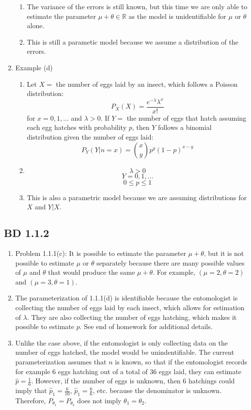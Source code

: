 \documentclass[a4paper,12pt]{article}
\begin{document}
\begin{enumerate}
\begin{enumerate}
      \item The variance of the errors is still known, but this time we are only able to estimate the parameter $\mu+\theta\in\mathbb{R}$ as the model is unidentifiable for $\mu$ or $\theta$ alone.
      \item This is still a parametic model because we assume a distribution of the errors.
    \end{enumerate}
    \item Example (d)
    \begin{enumerate}
       \item Let $X=$ the number of eggs laid by an insect, which follows a Poisson distribution:$$P_X(X)=\frac{e^{-\lambda}\lambda^x}{x!}$$ for $x=0,1,...$ and $\lambda>0$. If $Y=$ the number of eggs that hatch assuming each egg hatches with probability $p$, then $Y$ follows a binomial distribution given the number of eggs laid:$$P_Y(Y|n=x)={x\choose y}p^y(1-p)^{x-y}$$
       \item $$\lambda>0$$ $$Y=0,1,...$$ $$0\leq p\leq 1$$
       \item This is also a parametric model because we are assuming distributions for $X$ and $Y|X$.
     \end{enumerate}
\end{enumerate}
\subsection{BD 1.1.2}
\begin{enumerate}
  \item Problem 1.1.1(c): It is possible to estimate the parameter $\mu+\theta$, but it is not possible to estimate $\mu$ or $\theta$ separately because there are many possible values of $\mu$ and $\theta$ that would produce the same $\mu+\theta$. For example, $(\mu=2,\theta=2)$ and $(\mu=3,\theta=1)$.
  \item The parameterization of 1.1.1(d) is identifiable because the entomologist is collecting the number of eggs laid by each insect, which allows for estimation of $\lambda$. They are also collecting the number of eggs hatching, which makes it possible to estimate $p$. See end of homework for additional details.
  \item Unlike the case above, if the entomologist is only collecting data on the number of eggs hatched, the model would be unindentifiable. The current parameterization assumes that $n$ is known, so that if the entomologist records for example 6 eggs hatching out of a total of 36 eggs laid, they can estimate $\hat{p}=\frac{1}{6}$. However, if the number of eggs is unknown, then 6 hatchings could imply that $\hat{p}_1=\frac{6}{10}$, $\hat{p}_1=\frac{6}{6}$, etc. because the denominator is unknown. Therefore, $P_{\theta_1}=P_{\theta_2}$ does not imply $\theta_1=\theta_2$.
\end{enumerate}
\end{document}
